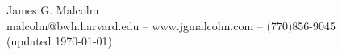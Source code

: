 \documentclass{article}
\begin{document}
\titleformat{\section}[block]{\normalfont}{\thesection}{.5em}{\titlerule\\[.8ex]\bfseries}
\titleformat{\subsection}{\normalfont}{\thesection}{-.5em}{\vspace{-1.5ex}\slshape}


\begin{center}
  {\Large James G. Malcolm} \\
  {\small
    malcolm@bwh.harvard.edu --
    www.jgmalcolm.com --
    (770)856-9045} \\
  {\small (updated \today)}
\end{center}
\vspace{-1.7em}
\end{document}

